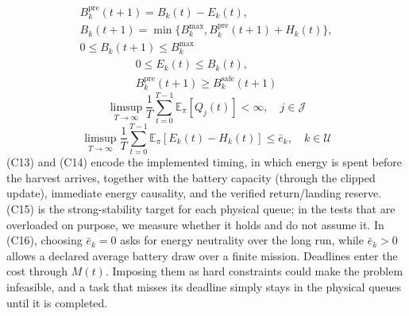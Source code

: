 \begin{equation}
\begin{gathered}
B_k^{\mathrm{pre}}(t+1)=B_k(t)-E_k(t),\\
B_k(t+1)=\min\{B_k^{\max},B_k^{\mathrm{pre}}(t+1)+H_k(t)\},\\
0\le B_k(t+1)\le B_k^{\max}
\end{gathered}
\tag{C13}\label{con:battery-dynamics}
\end{equation}
\begin{equation}
\begin{gathered}
0\le E_k(t)\le B_k(t),\\
B_k^{\mathrm{pre}}(t+1)\ge B_k^{\mathrm{safe}}(t+1)
\end{gathered}
\tag{C14}\label{con:energy-reserve}
\end{equation}
\begin{equation}
\limsup_{T\to\infty}\frac1T\sum_{t=0}^{T-1}
\mathbb E_{\pi}[Q_j(t)]<\infty,\quad j\in\mathcal J
\tag{C15}\label{con:queue-stability}
\end{equation}
\begin{equation}
\limsup_{T\to\infty}\frac1T\sum_{t=0}^{T-1}
\mathbb E_{\pi}[E_k(t)-H_k(t)]\le\bar e_k,\quad k\in\mathcal U
\tag{C16}\label{con:average-energy}
\end{equation}
(C13) and (C14) encode the implemented timing, in which energy is spent
before the harvest arrives, together with the battery capacity (through the
clipped update), immediate energy causality, and the verified return/landing
reserve. (C15) is the strong-stability target for each physical queue; in the
tests that are overloaded on purpose, we measure whether it holds and do not
assume it. In (C16), choosing $\bar e_k=0$ asks for energy neutrality over
the long run, while $\bar e_k>0$ allows a declared average battery draw over
a finite mission. Deadlines enter the cost through $M(t)$. Imposing them as
hard constraints could make the problem infeasible, and a task that misses its
deadline simply stays in the physical queues until it is completed.
